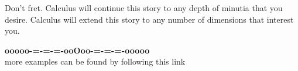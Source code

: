 \documentclass{ximera}
\begin{document}
Don't fret. Calculus will continue this story to any depth of minutia that you desire. Calculus will extend this story to any number of dimensions that interest you.











\begin{center}
\textbf{\textcolor{green!50!black}{ooooo-=-=-=-ooOoo-=-=-=-ooooo}} \\

more examples can be found by following this link\\ 

\end{center}
\end{document}
